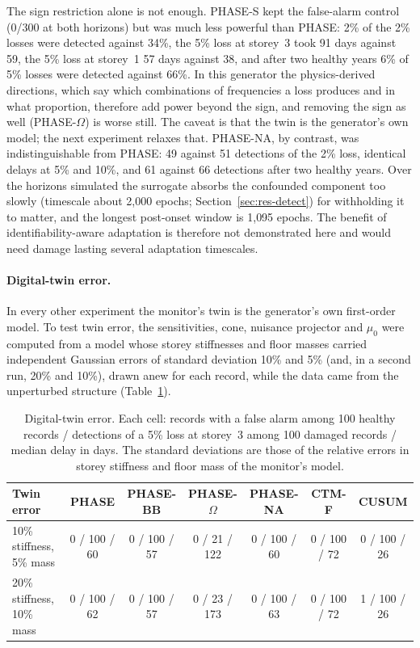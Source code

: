 \documentclass[12pt,a4paper]{article}
\newenvironment{revblock}{}{}
\newenvironment{revblock}{\begingroup\color{revcol}}{\endgroup}
\begin{document}
\begin{revblock}
The sign restriction alone is not enough. PHASE-S kept the false-alarm control (0/300 at both horizons) but was much less powerful than PHASE: 2\% of the 2\% losses were detected against 34\%, the 5\% loss at storey~3 took 91 days against 59, the 5\% loss at storey~1 57 days against 38, and after two healthy years 6\% of 5\% losses were detected against 66\%. In this generator the physics-derived directions, which say which combinations of frequencies a loss produces and in what proportion, therefore add power beyond the sign, and removing the sign as well (PHASE-$\Omega$) is worse still. The caveat is that the twin is the generator's own model; the next experiment relaxes that. PHASE-NA, by contrast, was indistinguishable from PHASE: 49 against 51 detections of the 2\% loss, identical delays at 5\% and 10\%, and 61 against 66 detections after two healthy years. Over the horizons simulated the surrogate absorbs the confounded component too slowly (timescale about 2{,}000 epochs; Section~\ref{sec:res-detect}) for withholding it to matter, and the longest post-onset window is 1{,}095 epochs. The benefit of identifiability-aware adaptation is therefore not demonstrated here and would need damage lasting several adaptation timescales.

\paragraph{Digital-twin error.} In every other experiment the monitor's twin is the generator's own first-order model. To test twin error, the sensitivities, cone, nuisance projector and $\mu_0$ were computed from a model whose storey stiffnesses and floor masses carried independent Gaussian errors of standard deviation 10\% and 5\% (and, in a second run, 20\% and 10\%), drawn anew for each record, while the data came from the unperturbed structure (Table~\ref{tab:twin}).

\begin{table}[t]
\centering
\scriptsize
\caption{Digital-twin error. Each cell: records with a false alarm among 100 healthy records / detections of a 5\% loss at storey~3 among 100 damaged records / median delay in days. The standard deviations are those of the relative errors in storey stiffness and floor mass of the monitor's model.}
\label{tab:twin}
\setlength{\tabcolsep}{2pt}
\begin{tabular}{lcccccc}
\toprule
Twin error & PHASE & PHASE-BB & PHASE-$\Omega$ & PHASE-NA & CTM-F & CUSUM \\
\midrule
10\% stiffness, 5\% mass & 0 / 100 / 60 & 0 / 100 / 57 & 0 / 21 / 122 & 0 / 100 / 60 & 0 / 100 / 72 & 0 / 100 / 26 \\
20\% stiffness, 10\% mass & 0 / 100 / 62 & 0 / 100 / 57 & 0 / 23 / 173 & 0 / 100 / 63 & 0 / 100 / 72 & 1 / 100 / 26 \\
\bottomrule
\end{tabular}
\end{table}


\end{revblock}
\end{document}

